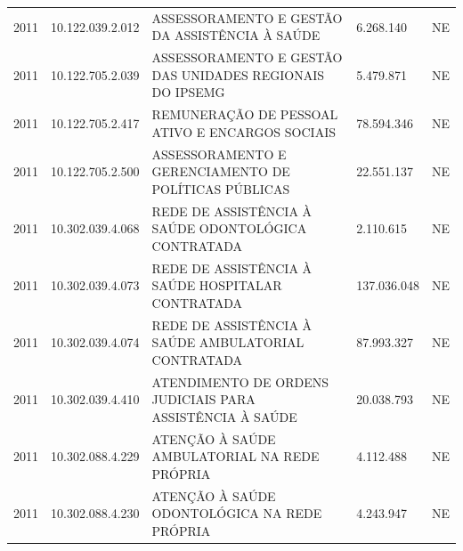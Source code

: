 \documentclass{article}
\begin{document}
\begin{longtable}[c]{m{1cm}|m{2cm}|m{10cm}|m{2cm}|m{1cm}}
\multicolumn{1}{C{1cm}|}{2011} & \multicolumn{1}{C{2cm}|}{10.122.039.2.012} & \multicolumn{1}{L{10cm}|}{ASSESSORAMENTO E GESTÃO DA ASSISTÊNCIA À SAÚDE} & \multicolumn{1}{R{2cm}|}{6.268.140} & \multicolumn{1}{C{1cm}}{NE} \\
\multicolumn{1}{C{1cm}|}{2011} & \multicolumn{1}{C{2cm}|}{10.122.705.2.039} & \multicolumn{1}{L{10cm}|}{ASSESSORAMENTO E GESTÃO DAS UNIDADES REGIONAIS DO IPSEMG} & \multicolumn{1}{R{2cm}|}{5.479.871} & \multicolumn{1}{C{1cm}}{NE} \\
\multicolumn{1}{C{1cm}|}{2011} & \multicolumn{1}{C{2cm}|}{10.122.705.2.417} & \multicolumn{1}{L{10cm}|}{REMUNERAÇÃO DE PESSOAL ATIVO E ENCARGOS SOCIAIS} & \multicolumn{1}{R{2cm}|}{78.594.346} & \multicolumn{1}{C{1cm}}{NE} \\
\multicolumn{1}{C{1cm}|}{2011} & \multicolumn{1}{C{2cm}|}{10.122.705.2.500} & \multicolumn{1}{L{10cm}|}{ASSESSORAMENTO E GERENCIAMENTO DE POLÍTICAS PÚBLICAS} & \multicolumn{1}{R{2cm}|}{22.551.137} & \multicolumn{1}{C{1cm}}{NE} \\
\multicolumn{1}{C{1cm}|}{2011} & \multicolumn{1}{C{2cm}|}{10.302.039.4.068} & \multicolumn{1}{L{10cm}|}{REDE DE ASSISTÊNCIA À SAÚDE ODONTOLÓGICA CONTRATADA} & \multicolumn{1}{R{2cm}|}{2.110.615} & \multicolumn{1}{C{1cm}}{NE} \\
\multicolumn{1}{C{1cm}|}{2011} & \multicolumn{1}{C{2cm}|}{10.302.039.4.073} & \multicolumn{1}{L{10cm}|}{REDE DE ASSISTÊNCIA À SAÚDE HOSPITALAR CONTRATADA} & \multicolumn{1}{R{2cm}|}{137.036.048} & \multicolumn{1}{C{1cm}}{NE} \\
\multicolumn{1}{C{1cm}|}{2011} & \multicolumn{1}{C{2cm}|}{10.302.039.4.074} & \multicolumn{1}{L{10cm}|}{REDE DE ASSISTÊNCIA À SAÚDE AMBULATORIAL CONTRATADA} & \multicolumn{1}{R{2cm}|}{87.993.327} & \multicolumn{1}{C{1cm}}{NE} \\
\multicolumn{1}{C{1cm}|}{2011} & \multicolumn{1}{C{2cm}|}{10.302.039.4.410} & \multicolumn{1}{L{10cm}|}{ATENDIMENTO DE ORDENS JUDICIAIS PARA ASSISTÊNCIA À SAÚDE} & \multicolumn{1}{R{2cm}|}{20.038.793} & \multicolumn{1}{C{1cm}}{NE} \\
\multicolumn{1}{C{1cm}|}{2011} & \multicolumn{1}{C{2cm}|}{10.302.088.4.229} & \multicolumn{1}{L{10cm}|}{ATENÇÃO À SAÚDE AMBULATORIAL NA REDE PRÓPRIA} & \multicolumn{1}{R{2cm}|}{4.112.488} & \multicolumn{1}{C{1cm}}{NE} \\
\multicolumn{1}{C{1cm}|}{2011} & \multicolumn{1}{C{2cm}|}{10.302.088.4.230} & \multicolumn{1}{L{10cm}|}{ATENÇÃO À SAÚDE ODONTOLÓGICA NA REDE PRÓPRIA} & \multicolumn{1}{R{2cm}|}{4.243.947} & \multicolumn{1}{C{1cm}}{NE} \\

\end{longtable}
\end{document}
